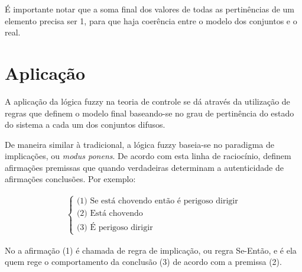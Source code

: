 \begin{table}[!ht]
	\caption{Tabela de Exemplos}
	\label{tabPertEx}
	\small
	\centering
\end{table}

É importante notar que a soma final dos valores de todas as pertinências de um elemento precisa ser 1, para que haja coerência entre o modelo dos conjuntos e o real.

\section{Aplicação}
A aplicação da 
lógica fuzzy na teoria de controle se dá através da utilização de regras que definem o modelo final baseando-se no grau de pertinência do estado do sistema a cada um dos conjuntos difusos. 

De maneira similar à tradicional, a lógica fuzzy baseia-se no paradigma de implicações, ou \textit{modus ponens}. De acordo com esta linha de raciocínio, definem afirmações premissas que quando verdadeiras determinam a autenticidade de afirmações conclusões. Por exemplo:

\begin{align} \label{eqRegrasEx}
\begin{cases}
	\text{(1) Se está  chovendo então é perigoso dirigir}\\
	\text{(2) Está chovendo }\\
	\text{(3) É perigoso dirigir}
\end{cases}		
\end{align}

No  a afirmação (1) é chamada de regra de implicação, ou regra Se-Então, e é ela quem rege o comportamento da conclusão (3) de acordo com a premissa (2).

